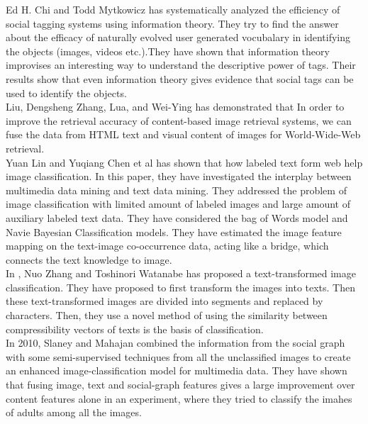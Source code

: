 \hspace*{1cm} Ed H. Chi and Todd Mytkowicz \cite{chi2008understanding} has systematically analyzed the efficiency of social tagging systems using information theory. They try to find the answer about the efficacy of naturally evolved user generated vocubalary in identifying the objects (images, videos etc.).They have shown that information theory improvises an interesting way to understand the descriptive power of tags. Their results show that even information theory gives evidence that social tags can be used to identify the objects.\\
\hspace*{1cm} Liu, Dengsheng Zhang, Lua, and Wei-Ying \cite{liu} has demonstrated that In order to improve the retrieval accuracy of content-based image retrieval systems, we can fuse the data from HTML text and visual content of images for World-Wide-Web retrieval.\\
\hspace*{1cm} Yuan Lin and Yuqiang Chen et al \cite{heterogenous} has shown that how labeled text form web  help image classification. In this paper, they have investigated the interplay between multimedia data mining and text data mining. They addressed the problem of image classification with limited amount of labeled images and large amount of auxiliary labeled text data. They have considered the bag of Words model and Navie Bayesian Classification models. They have estimated the image feature mapping on the text-image co-occurrence data, acting like a bridge, which connects the text knowledge to image.\\
\hspace*{1cm} In \cite{textTransformed}, Nuo Zhang and Toshinori Watanabe has proposed a text-transformed image classification. They have proposed to first transform the images into texts. Then these text-transformed images are divided into segments and replaced by characters. Then, they use a novel method of using the similarity between compressibility vectors of texts is the basis of classification.\\
\hspace*{1cm} In 2010, Slaney and Mahajan \cite{dhruv} combined the information from the social graph with some semi-supervised techniques from all the unclassified images to create an enhanced image-classification model for multimedia data. They have shown that fusing image, text and social-graph features gives a large improvement over content features alone in an experiment, where they tried to classify the imahes of adults among all the images.\\
